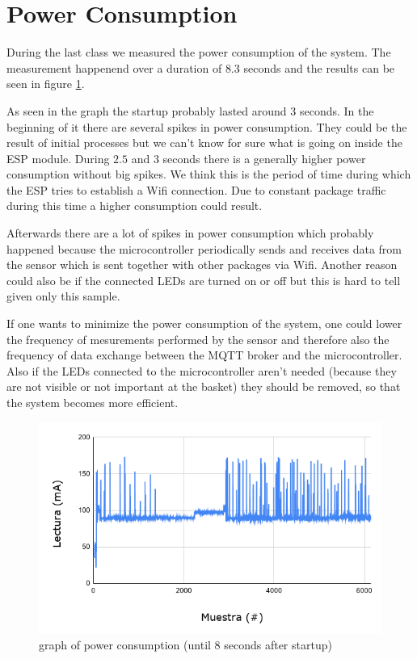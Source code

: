 \documentclass{article}
\begin{document}
\section{Power Consumption}
During the last class we measured the power consumption of the system. The
measurement happenend over a duration of $8.3$ seconds and the results can be
seen in figure \ref{chart_power}.\par
As seen in the graph the startup probably lasted around 3 seconds. In the
beginning of it there are several spikes in power consumption. They could be the
result of initial processes but we can't know for sure what is going on inside
the ESP module. During $2.5$ and $3$ seconds there is a generally higher power
consumption without big spikes. We think this is the period of time during which
the ESP tries to establish a Wifi connection. Due to constant package traffic
during this time a higher consumption could result.\par
Afterwards there are a lot of spikes in power consumption which probably
happened because the microcontroller periodically sends and receives data from
the sensor which is sent together with other packages via Wifi. Another reason
could also be if the connected LEDs are turned on or off but this is hard to
tell given only this sample.\par
If one wants to minimize the power consumption of the system, one could lower
the frequency of mesurements performed by the sensor and therefore also the
frequency of data exchange between the MQTT broker and the microcontroller. Also
if the LEDs connected to the microcontroller aren't needed (because they are not
visible or not important at the basket) they should be removed, so that the
system becomes more efficient.

\begin{figure}[]
	\centering \includegraphics[scale=0.5]{images/chart.png}
	\caption{graph of power consumption (until 8 seconds after startup)}
	\label{chart_power}
\end{figure}
\end{document}
